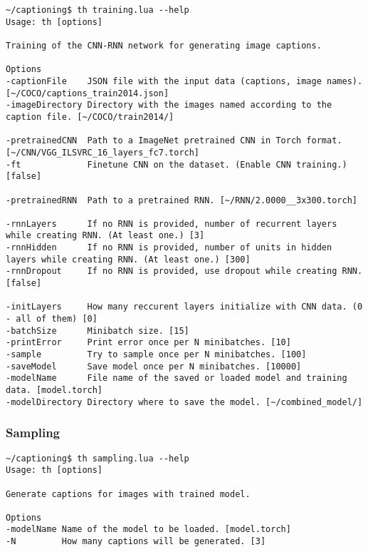 \begin{lstlisting}[firstnumber=1,breakindent=75pt]
~/captioning$ th training.lua --help
Usage: th [options] 

Training of the CNN-RNN network for generating image captions.

Options
-captionFile    JSON file with the input data (captions, image names). [~/COCO/captions_train2014.json]
-imageDirectory Directory with the images named according to the caption file. [~/COCO/train2014/]

-pretrainedCNN  Path to a ImageNet pretrained CNN in Torch format. [~/CNN/VGG_ILSVRC_16_layers_fc7.torch]
-ft             Finetune CNN on the dataset. (Enable CNN training.) [false]

-pretrainedRNN  Path to a pretrained RNN. [~/RNN/2.0000__3x300.torch]

-rnnLayers      If no RNN is provided, number of recurrent layers while creating RNN. (At least one.) [3]
-rnnHidden      If no RNN is provided, number of units in hidden layers while creating RNN. (At least one.) [300]
-rnnDropout     If no RNN is provided, use dropout while creating RNN. [false]

-initLayers     How many reccurent layers initialize with CNN data. (0 - all of them) [0]
-batchSize      Minibatch size. [15]
-printError     Print error once per N minibatches. [10]
-sample         Try to sample once per N minibatches. [100]
-saveModel      Save model once per N minibatches. [10000]
-modelName      File name of the saved or loaded model and training data. [model.torch]
-modelDirectory Directory where to save the model. [~/combined_model/]
\end{lstlisting}
\hspace{1cm}

\subsubsection{Sampling}

\begin{lstlisting}[firstnumber=1,breakindent=75pt]
~/captioning$ th sampling.lua --help
Usage: th [options] 

Generate captions for images with trained model.

Options
-modelName Name of the model to be loaded. [model.torch]
-N         How many captions will be generated. [3]
\end{lstlisting}
\hspace{1cm}

